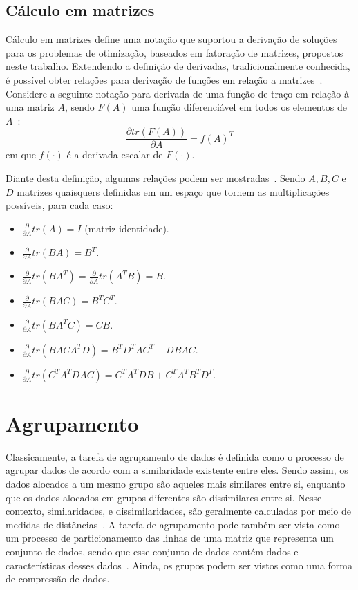 \documentclass[
    12pt,                %
    oneside,            %
    a4paper,            %
    english,            %
    brazil                %
    ]{abntex2ppgsi}
\begin{document}
\subsection{Cálculo em matrizes}
\label{subsec:matrixcalculus}

Cálculo em matrizes define uma notação que suportou a derivação de soluções para os problemas de otimização, baseados em fatoração de matrizes, propostos neste trabalho.
Extendendo a definição de derivadas, tradicionalmente conhecida, é possível obter relações para derivação de funções em relação a matrizes~\cite{Magnus1999}.
Considere a seguinte notação para derivada de uma função de traço em relação à uma matriz $A$, sendo $F(A)$ uma função diferenciável em todos os elementos de $A$~\cite{Petersen2012}:
\[
    \frac{\partial tr(F(A))}{\partial A} = f(A)^T
\]
em que $f(\cdot)$ é a derivada escalar de $F(\cdot)$.

Diante desta definição, algumas relações podem ser mostradas~\cite{Petersen2012}.
Sendo $A, B, C$ e $D$ matrizes quaisquers definidas em um espaço que tornem as multiplicações possíveis, para cada caso:
\begin{itemize}
    \item $\frac{\partial}{\partial A} tr(A) = I$ (matriz identidade).
    \item $\frac{\partial}{\partial A} tr(B A) = B^T$.
    \item $\frac{\partial}{\partial A} tr(B A^T) = \frac{\partial}{\partial A} tr(A^T B) = B$.
    \item $\frac{\partial}{\partial A} tr(B A C) = B^T C^T$.
    \item $\frac{\partial}{\partial A} tr(B A^T C) = CB$.
    \item $\frac{\partial}{\partial A} tr(B A C A^T D) = B^T D^T A C^T + D B A C$.
    \item $\frac{\partial}{\partial A} tr(C^T A^T D A C) = C^T A^T D B + C^T A^T B^T D^T$.
\end{itemize}

\section{Agrupamento}
\label{sec:clustering}

Classicamente, a tarefa de agrupamento de dados é definida como o processo de agrupar dados de acordo com a similaridade existente entre eles.
Sendo assim, os dados alocados a um mesmo grupo são aqueles mais similares entre si, enquanto que os dados alocados em grupos diferentes são dissimilares entre si.
Nesse contexto, similaridades, e dissimilaridades, são geralmente calculadas por meio de medidas de distâncias~\cite{Han2011}.
A tarefa de agrupamento pode também ser vista como um processo de particionamento das linhas de uma matriz que representa um conjunto de dados, sendo que esse conjunto de dados contém dados e características desses dados~\cite{Han2011}.
Ainda, os grupos podem ser vistos como uma forma de compressão de dados.
\end{document}
